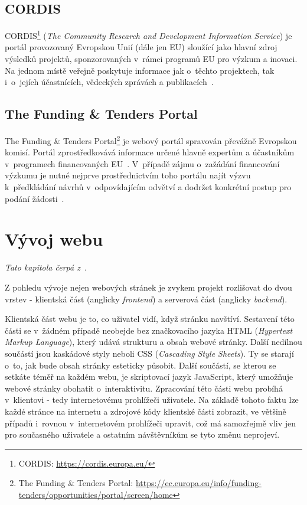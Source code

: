 \blindtext[2]

\subsection{CORDIS}
CORDIS\footnote{CORDIS: \url{https://cordis.europa.eu/}} (\emph{The Community Research and Development Information Service}) je portál provozovaný Evropskou Unií (dále jen EU) sloužící jako hlavní zdroj výsledků projektů, sponzorovaných v~rámci programů EU pro výzkum a inovaci. Na jednom místě veřejně poskytuje informace jak o~těchto projektech, tak i~o~jejích účastnících, vědeckých zprávách a publikacích~\cite{bib:cordis}.

\subsection{The Funding \& Tenders Portal}

The Funding \& Tenders Portal\footnote{The Funding \& Tenders Portal: \url{https://ec.europa.eu/info/funding-tenders/opportunities/portal/screen/home}} je webový portál spravován převážně Evropskou komisí. Portál zprostředkovává informace určené hlavně expertům a účastníkům v~programech financovaných EU~\cite{bib:funding-about}.
V~případě zájmu o~zažádání financování výzkumu je nutné nejprve prostřednictvím toho portálu najít výzvu k~předkládání návrhů v~odpovídajícím odvětví a dodržet konkrétní postup pro podání žádosti~\cite{bib:funding-find}.



\section{Vývoj webu}
\emph{Tato kapitola čerpá z~\cite{bib:web-development}}.

Z pohledu vývoje nejen webových stránek je zvykem projekt rozlišovat do dvou vrstev - klientská část (anglicky \emph{frontend}) a serverová část (anglicky \emph{backend}).

Klientská část webu je to, co uživatel vidí, když stránku navštíví. Sestavení této části se v~žádném případě neobejde bez značkovacího jazyka HTML (\emph{Hypertext Markup Language}), který udává strukturu a obsah webové stránky. Další nedílnou součástí jsou kaskádové styly neboli CSS (\emph{Cascading Style Sheets}). Ty se starají o~to, jak bude obsah stránky esteticky působit. Další součástí, se kterou se setkáte téměř na každém webu, je skriptovací jazyk JavaScript, který umožňuje webové stránky obohatit o~interaktivitu.
Zpracování této části webu probíhá v~klientovi - tedy internetovému prohlížeči uživatele. Na základě tohoto faktu lze každé stránce na internetu  a zdrojové kódy klientské části zobrazit, ve většině případů i~rovnou v~internetovém prohlížeči upravit, což má samozřejmě vliv jen pro současného uživatele a ostatním návštěvníkům se tyto změnu neprojeví.


